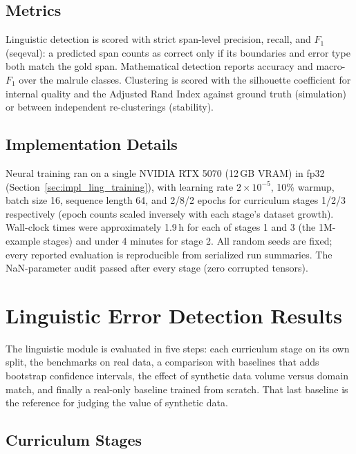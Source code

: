 \subsection{Metrics}
\label{sec:eval_setup_metrics}

Linguistic detection is scored with strict span-level precision, recall, and $F_1$ (seqeval): a predicted span counts as correct only if its boundaries and error type both match the gold span. Mathematical detection reports accuracy and macro-$F_1$ over the malrule classes. Clustering is scored with the silhouette coefficient \parencite{Rousseeuw1987} for internal quality and the Adjusted Rand Index \parencite{HubertArabie1985} against ground truth (simulation) or between independent re-clusterings (stability).

\subsection{Implementation Details}
\label{sec:eval_setup_impl}

Neural training ran on a single NVIDIA RTX 5070 (12\,GB VRAM) in fp32 (Section~\ref{sec:impl_ling_training}), with learning rate $2\times10^{-5}$, 10\% warmup, batch size 16, sequence length 64, and 2/8/2 epochs for curriculum stages 1/2/3 respectively (epoch counts scaled inversely with each stage's dataset growth). Wall-clock times were approximately 1.9\,h for each of stages 1 and 3 (the 1M-example stages) and under 4 minutes for stage 2. All random seeds are fixed; every reported evaluation is reproducible from serialized run summaries. The NaN-parameter audit passed after every stage (zero corrupted tensors).

\section{Linguistic Error Detection Results}
\label{sec:eval_ling}

The linguistic module is evaluated in five steps: each curriculum stage on its own split, the benchmarks on real data, a comparison with baselines that adds bootstrap confidence intervals, the effect of synthetic data volume versus domain match, and finally a real-only baseline trained from scratch. That last baseline is the reference for judging the value of synthetic data.

\subsection{Curriculum Stages}
\label{sec:eval_ling_stages}

